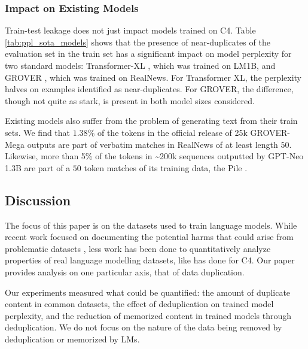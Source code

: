 

\subsubsection{Impact on Existing Models} \label{sec:eval-existing-models}
Train-test leakage does not just impact models trained on C4.
Table \ref{tab:ppl_sota_models} shows that
the presence of near-duplicates of the evaluation set
in the train set has a significant impact on model perplexity for two standard models: Transformer-XL \citep{dai2019transformer}, which was trained on LM1B, and GROVER \citep{zellers2019defending}, which was trained on RealNews.
For Transformer XL, the perplexity halves on examples identified as near-duplicates.
For GROVER, the difference, though not quite as stark, is present in both model sizes considered.

Existing models also suffer from the problem of generating text from their train sets.
We find that $1.38\%$ of the tokens in the official release of 25k GROVER-Mega outputs
are part of verbatim matches in RealNews of at least length $50$.
Likewise, more than 5\% of the tokens in \textasciitilde 200k sequences outputted by GPT-Neo 1.3B \citep{gpt-neo} are part of a $50$ token matches of its training data, the Pile \citep{pile}.

\subsection{Discussion}
The focus of this paper is on the datasets used to train language models.
While recent work focused on documenting the potential harms that could arise from problematic datasets  \cite{bender2018data, gebru2020datasheets}, less work has been done to 
quantitatively analyze properties of real language modelling datasets, like \citet{dodge2021documenting} has done for C4.
Our paper provides analysis on one particular axis, that of data duplication.

Our experiments measured what could be quantified: the amount of duplicate content in common datasets, the effect of deduplication on trained model perplexity, and the reduction of memorized content in trained models through deduplication.
We do not focus on the nature of the data being removed by deduplication or memorized by LMs.

